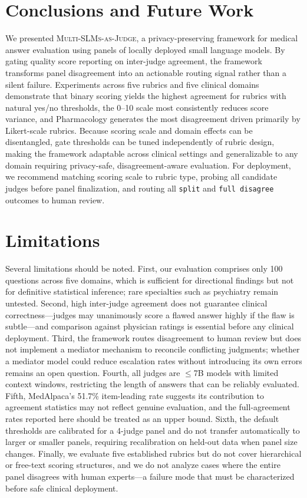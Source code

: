 \documentclass[11pt]{article}
\begin{document}
\section{Conclusions and Future Work}

We presented \textsc{Multi-SLMs-as-Judge}, a privacy-preserving framework for medical answer evaluation using panels of locally deployed small language models. By gating quality score reporting on inter-judge agreement, the framework transforms panel disagreement into an actionable routing signal rather than a silent failure. Experiments across five rubrics and five clinical domains demonstrate that binary scoring yields the highest agreement for rubrics with natural yes/no thresholds, the 0--10 scale most consistently reduces score variance, and Pharmacology generates the most disagreement driven primarily by Likert-scale rubrics. Because scoring scale and domain effects can be disentangled, gate thresholds can be tuned independently of rubric design, making the framework adaptable across clinical settings and generalizable to any domain requiring privacy-safe, disagreement-aware evaluation. For deployment, we recommend matching scoring scale to rubric type, probing all candidate judges before panel finalization, and routing all \texttt{split} and \texttt{full disagree} outcomes to human review.

\section*{Limitations}
Several limitations should be noted. First, our evaluation comprises only 100 questions across five domains, which is sufficient for directional findings but not for definitive statistical inference; rare specialties such as psychiatry remain untested. Second, high inter-judge agreement does not guarantee clinical correctness—judges may unanimously score a flawed answer highly if the flaw is subtle—and comparison against physician ratings is essential before any clinical deployment. Third, the framework routes disagreement to human review but does not implement a mediator mechanism to reconcile conflicting judgments; whether a mediator model could reduce escalation rates without introducing its own errors remains an open question. Fourth, all judges are $\leq$7B models with limited context windows, restricting the length of answers that can be reliably evaluated. Fifth, MedAlpaca's 51.7\% item-leading rate suggests its contribution to agreement statistics may not reflect genuine evaluation, and the full-agreement rates reported here should be treated as an upper bound. Sixth, the default thresholds are calibrated for a 4-judge panel and do not transfer automatically to larger or smaller panels, requiring recalibration on held-out data when panel size changes. Finally, we evaluate five established rubrics but do not cover hierarchical or free-text scoring structures, and we do not analyze cases where the entire panel disagrees with human experts—a failure mode that must be characterized before safe clinical deployment.
\end{document}
